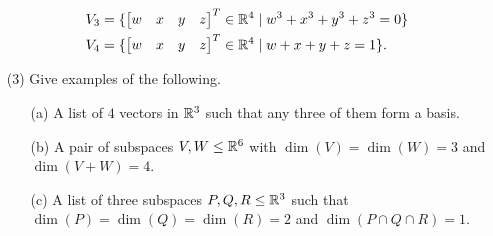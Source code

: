 \documentclass[a4paper]{article}
\begin{document}
\begin{problem}[2011-12]
\begin{itemize}
\begin{align*}
    V_3 &= \{\left[\begin{matrix} w&x&y&z\end{matrix}\right]^T \in{\mathbb{R}}^4 \;|\; w^3+x^3+y^3+z^3=0\} \\
    V_4 &= \{\left[\begin{matrix} w&x&y&z\end{matrix}\right]^T \in{\mathbb{R}}^4 \;|\; w+x+y+z=1\}.
   \end{align*}
  \item[(3)] Give examples of the following. 
   \begin{itemize}
    \item[(a)] A list of $4$ vectors in ${\mathbb{R}}^3$ such that any three of
     them form a basis.
    \item[(b)] A pair of subspaces $V,W\leq{\mathbb{R}}^6$ with
     $\dim(V)=\dim(W)=3$ and $\dim(V+W)=4$.
    \item[(c)] A list of three subspaces $P,Q,R\leq{\mathbb{R}}^3$ such that
     $\dim(P)=\dim(Q)=\dim(R)=2$ and $\dim(P\cap Q\cap R)=1$.
   \end{itemize}
 \end{itemize}
\end{problem}
\end{document}
